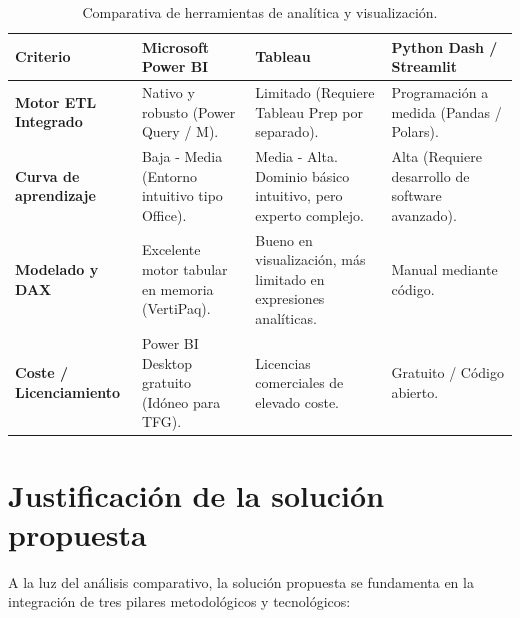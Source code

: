 \documentclass[12pt, a4paper, twoside]{report}
\begin{document}
\begin{table}[h!]
\centering
\caption{Comparativa de herramientas de analítica y visualización.}
\label{tab:comp_herramientas}
\small
\begin{tabularx}{\textwidth}{@{} p{3.0cm} p{3.2cm} p{3.2cm} X @{}}
\toprule
\textbf{Criterio} & \textbf{Microsoft Power BI} & \textbf{Tableau} & \textbf{Python Dash / Streamlit} \\ \midrule
\textbf{Motor ETL Integrado} & Nativo y robusto (Power Query / M). & Limitado (Requiere Tableau Prep por separado). & Programación a medida (Pandas / Polars). \\ \addlinespace
\textbf{Curva de aprendizaje} & Baja - Media (Entorno intuitivo tipo Office). & Media - Alta. Dominio básico intuitivo, pero experto complejo. & Alta (Requiere desarrollo de software avanzado). \\ \addlinespace
\textbf{Modelado y DAX} & Excelente motor tabular en memoria (VertiPaq). & Bueno en visualización, más limitado en expresiones analíticas. & Manual mediante código. \\ \addlinespace
\textbf{Coste / Licenciamiento} & Power BI Desktop gratuito (Idóneo para TFG). & Licencias comerciales de elevado coste. & Gratuito / Código abierto. \\ \bottomrule
\end{tabularx}
\end{table}

\section{Justificación de la solución propuesta}
A la luz del análisis comparativo, la solución propuesta se fundamenta en la integración de tres pilares metodológicos y tecnológicos:
\end{document}
